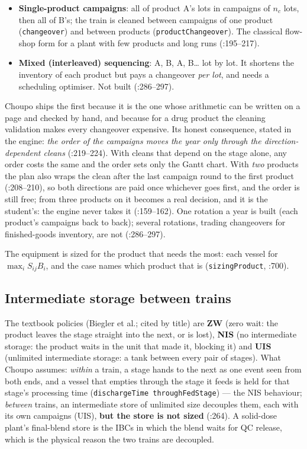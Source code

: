 \documentclass[11pt,a4paper]{article}
\providecommand{\tightlist}{\setlength{\itemsep}{0pt}\setlength{\parskip}{0pt}}
\begin{document}
\begin{itemize}
\tightlist
\item
  \textbf{Single-product campaigns}: all of product A's lots in
  campaigns of $n_c$ lots, then all of B's; the train is cleaned
  between campaigns of one product (\texttt{changeover}) and between
  products (\texttt{productChangeover}). The classical
  flow-shop form for a plant with few products and long runs
  (:195--217).
\item
  \textbf{Mixed (interleaved) sequencing}: A, B, A, B\ldots{} lot by lot.
  It shortens the inventory of each product but pays a changeover
  \emph{per lot}, and needs a scheduling optimiser. Not built
  (:286--297).
\end{itemize}
Choupo ships the first because it is the one whose arithmetic can be
written on a page and checked by hand, and because for a drug product
the cleaning validation makes every changeover expensive. Its honest
consequence, stated in the engine: \emph{the order of the campaigns
moves the year only through the direction-dependent cleans}
(:219--224). With cleans that depend on the stage
alone, any order costs the same and the order sets only the Gantt chart.
With \emph{two} products the plan also wraps the clean after the last
campaign round to the first product (:208--210),
so both directions are paid once whichever goes first, and the order is
still free; from three products on it becomes a real decision, and it
is the student's: the engine never takes it
(:159--162). One rotation a year is built (each
product's campaigns back to back); several rotations, trading
changeovers for finished-goods inventory, are not
(:286--297).

The equipment is sized for the product that needs the most: each vessel
for $\max_i S_{ij} B_i$, and the case names which product that is
(\texttt{sizingProduct}, :700).

\subsection{Intermediate storage between
trains}\label{mp-storage}

The textbook policies (Biegler et al.; cited by title) are
\textbf{ZW} (zero wait: the product leaves the stage straight into the
next, or is lost), \textbf{NIS} (no intermediate storage: the product
waits in the unit that made it, blocking it) and \textbf{UIS}
(unlimited intermediate storage: a tank between every pair of
stages). What Choupo assumes: \emph{within} a train, a stage hands to
the next as one event seen from both ends, and a vessel that empties
through the stage it feeds is held for that stage's processing time
(\texttt{dischargeTime throughFedStage}) --- the NIS behaviour;
\emph{between} trains, an intermediate store of unlimited size
decouples them, each with its own campaigns (UIS), \textbf{but the
store is not sized} (:264). A solid-dose
plant's final-blend store is the IBCs in which the blend waits for QC
release, which is the physical reason the two trains are decoupled.
\end{document}
